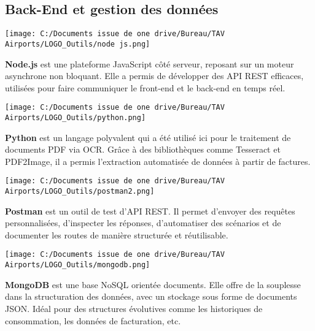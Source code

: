 \documentclass[a4paper,11pt]{report}
\begin{document}
\vspace{1em}

\subsection*{Back-End et gestion des données}

\tcolorbox[title=Node.js]
\begin{minipage}{0.15\textwidth}
  \texttt{[image: C:/Documents issue de one drive/Bureau/TAV Airports/LOGO\_Outils/node js.png]}
\end{minipage}
\hfill
\begin{minipage}{0.8\textwidth}
\textbf{Node.js} est une plateforme JavaScript côté serveur, reposant sur un moteur asynchrone non bloquant. Elle a permis de développer des API REST efficaces, utilisées pour faire communiquer le front-end et le back-end en temps réel.
\end{minipage}
\endtcolorbox

\tcolorbox[title=Python]
\begin{minipage}{0.15\textwidth}
  \texttt{[image: C:/Documents issue de one drive/Bureau/TAV Airports/LOGO\_Outils/python.png]}
\end{minipage}
\hfill
\begin{minipage}{0.8\textwidth}
\textbf{Python} est un langage polyvalent qui a été utilisé ici pour le traitement de documents PDF via OCR. Grâce à des bibliothèques comme Tesseract et PDF2Image, il a permis l’extraction automatisée de données à partir de factures.
\end{minipage}
\endtcolorbox

\tcolorbox[title=Postman]
\begin{minipage}{0.15\textwidth}
  \texttt{[image: C:/Documents issue de one drive/Bureau/TAV Airports/LOGO\_Outils/postman2.png]}
\end{minipage}
\hfill
\begin{minipage}{0.8\textwidth}
\textbf{Postman} est un outil de test d’API REST. Il permet d’envoyer des requêtes personnalisées, d’inspecter les réponses, d’automatiser des scénarios et de documenter les routes de manière structurée et réutilisable.
\end{minipage}
\endtcolorbox

\tcolorbox[title=MongoDB]
\begin{minipage}{0.15\textwidth}
  \texttt{[image: C:/Documents issue de one drive/Bureau/TAV Airports/LOGO\_Outils/mongodb.png]}
\end{minipage}
\hfill
\begin{minipage}{0.8\textwidth}
\textbf{MongoDB} est une base NoSQL orientée documents. Elle offre de la souplesse dans la structuration des données, avec un stockage sous forme de documents JSON. Idéal pour des structures évolutives comme les historiques de consommation, les données de facturation, etc.
\end{minipage}
\endtcolorbox
\end{document}
